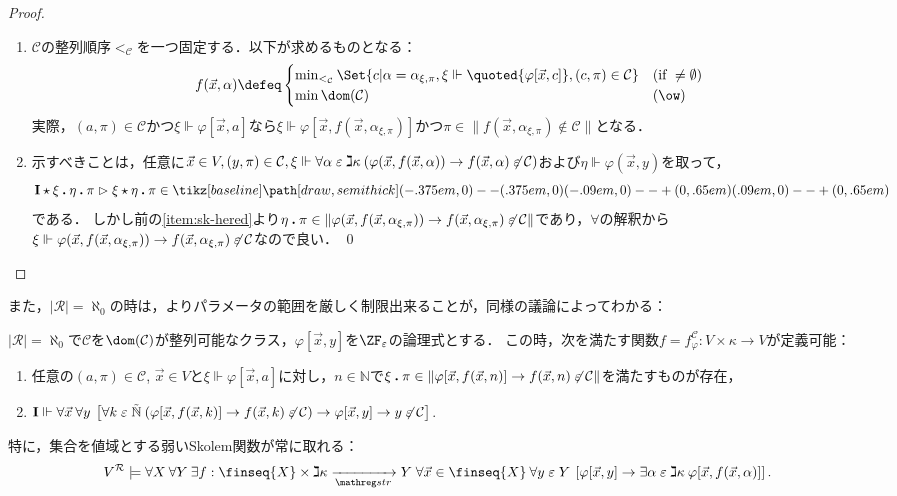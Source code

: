 \documentclass[realisability.tex]{subfiles}
\begin{document}
\begin{proof}
 \begin{enumerate}
  \item $\mathcal{C}$の整列順序${<_{\mathcal{C}}}$を一つ固定する．以下が求めるものとなる：
        \[
         f(\vec{x}, \alpha) \defeq
         \begin{cases}
          \min_{<_{\mathcal{C}}} \Set{c | \alpha = \alpha_{\xi, \pi}, \xi \Vdash \quoted{\varphi[\vec{x}, c]}, (c, \pi) \in \mathcal{C}} & (\text{if } \neq \emptyset)\\
          \min \dom(\mathcal{C}) & (\ow)
         \end{cases}
        \]
        実際，$(a, \pi) \in \mathcal{C}$かつ$\xi \Vdash \varphi[\vec{x}, a]$なら$\xi \Vdash \varphi[\vec{x}, f(\vec{x}, \alpha_{\xi,\pi})]$かつ$\pi \in \|f(\vec{x}, \alpha_{\xi,\pi}) \notin \mathcal{C}\|$となる．
  \item 示すべきことは，任意に$\vec{x} \in V, (y, \pi) \in \mathcal{C}, \xi \Vdash \forall \alpha \mathrel{\varepsilon} \gimel \kappa \:(\varphi(\vec{x}, f(\vec{x}, \alpha)) \to f(\vec{x}, \alpha) \not\mathrel{\varepsilon} \mathcal{C})$および$\eta \Vdash \varphi(\vec{x}, y)$を取って，
        \[
         \KVM{{\I}{\xi}{\eta}{\pi}} \redsto \KVM{{\xi}{\eta}{\pi}} \in \pole
        \]
        である．
        しかし前の\ref{item:sk-hered}より$\eta \mathbin{\boldsymbol{.}} \pi \in \|\varphi(\vec{x}, f(\vec{x}, \alpha_{\xi,\pi})) \to f(\vec{x}, \alpha_{\xi,\pi}) \not\mathrel{\varepsilon} \mathcal{C}\|$であり，$\forall$の解釈から$\xi \Vdash \varphi(\vec{x}, f(\vec{x}, \alpha_{\xi,\pi})) \to f(\vec{x}, \alpha_{\xi,\pi}) \not\mathrel{\varepsilon} \mathcal{C}$なので良い． \qed
 \end{enumerate}
\end{proof}
また，$|\mathcal{R}| = \aleph_0$の時は，よりパラメータの範囲を厳しく制限出来ることが，同様の議論によってわかる：
\begin{lemma}\label{lem:weak-skolem-ctbl}
 $|\mathcal{R}| = \aleph_0$で$\mathcal{C}$を$\dom(\mathcal{C})$が整列可能なクラス，$\varphi[\vec{x}, y]$を$\ZF_{\varepsilon}$の論理式とする．
 この時，次を満たす関数$f = f^{\mathcal{C}}_{\varphi}: V \times \kappa \to V$が定義可能：
 \begin{enumerate}
  \item \label{item:sk-hered}任意の$(a, \pi) \in \mathcal{C}$, $\vec{x} \in V$と$\xi \Vdash \varphi[\vec{x}, a]$に対し，$n \in \mathbb{N}$で$\xi \mathbin{\boldsymbol{.}} \pi \in \|\varphi[\vec{x}, f(\vec{x}, n)] \to f(\vec{x}, n) \not\mathrel{\varepsilon} \mathcal{C}\|$を満たすものが存在，
  \item $\mathsf{\mathbf{I}} \Vdash \forall \vec{x} \: \forall y \:\left[ \forall k \mathrel{\varepsilon} \mathord{\tilde{\mathbb{N}}}\: (\varphi[\vec{x}, f(\vec{x}, k)] \to f(\vec{x},k) \not\mathrel{\varepsilon} \mathcal{C}) \to \varphi[\vec{x}, y] \to y \not\mathrel{\varepsilon} \mathcal{C} \right]$. 
 \end{enumerate}
 特に，集合を値域とする弱いSkolem関数が常に取れる：
 \[
 V^{\mathcal{R}} \models \forall X\: \forall Y \: \exists f: \finseq{X} \times \gimel \kappa \strto Y\; \forall \vec{x} \in \finseq{X} \:\forall y \strin Y \: 
  \left[\varphi[\vec{x}, y] \to \exists \alpha \strin \gimel \kappa \: \varphi[\vec{x}, f(\vec{x}, \alpha)]\right].
 \]
\end{lemma}
\end{document}
